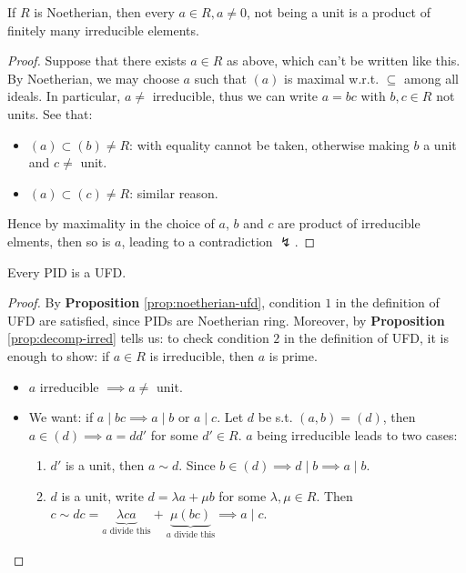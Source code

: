 \begin{proposition}
	\label{prop:noetherian-ufd}
	If \( R \) is Noetherian, then every \( a\in R, a\ne 0\), not being a unit is a product of
	finitely many irreducible elements.
\end{proposition}

\begin{proof}
	Suppose that there exists \( a\in R \) as above, which can't be written like this. By Noetherian,
	we may choose \( a \) such that \( (a) \) is maximal w.r.t. \( \subseteq \) among all ideals. In
	particular, \( a\ne \) irreducible, thus we can write \( a=bc \) with \( b,c \in R \) not units.
	See that:
	\begin{itemize}
		\item \( (a) \subset (b) \ne R \): with equality cannot be taken, otherwise making \( b \) a
		      unit and \( c\ne \) unit.
		\item \( (a)\subset (c) \ne R \): similar reason.
	\end{itemize}
	Hence by maximality in the choice of \( a \), \( b \) and \( c \) are product of irreducible
	elments, then so is \( a \), leading to a contradiction \( \lightning \).
\end{proof}

\begin{proposition}
	Every PID is a UFD.
\end{proposition}

\begin{proof}
	By \textbf{Proposition} \ref{prop:noetherian-ufd}, condition \( 1 \) in the
	definition of UFD are satisfied, since PIDs are Noetherian ring. Moreover, by \textbf{Proposition}
	\ref{prop:decomp-irred} tells us: to check condition \( 2 \) in the
	definition of UFD, it is enough to show: if \( a\in R \) is irreducible, then \( a \) is prime.
	\begin{itemize}
		\item \( a \) irreducible \( \implies a \ne \) unit.
		\item We want: if \( a\mid bc \implies a\mid b\) or \( a\mid c \). Let \( d \) be s.t.
		      \( (a,b) = (d) \), then \( a\in (d) \implies a = dd' \) for some \( d' \in R \). \( a \) being
		      irreducible leads to two cases:
		      \begin{enumerate}
			      \item \( d' \) is a unit, then \( a\sim d \). Since \( b \in (d)\implies d \mid b \implies
			            a\mid b \).
			      \item \( d \) is a unit, write \( d = \lambda a + \mu b \) for some \( \lambda, \mu
			            \in R\). Then \( c \sim dc = \underbrace{\lambda ca}_{a \text{ divide this}} +
			            \underbrace{\mu(bc)}_{a \text{ divide this}}\implies a\mid c \).
		      \end{enumerate}
	\end{itemize}
\end{proof}

